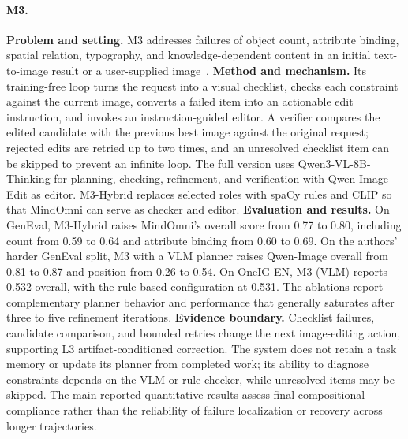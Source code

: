 \paragraph{M3.}
\textbf{Problem and setting.} M3 addresses failures of object count, attribute binding, spatial relation, typography, and knowledge-dependent content in an initial text-to-image result or a user-supplied image~\cite{avg260206166}. \textbf{Method and mechanism.} Its training-free loop turns the request into a visual checklist, checks each constraint against the current image, converts a failed item into an actionable edit instruction, and invokes an instruction-guided editor. A verifier compares the edited candidate with the previous best image against the original request; rejected edits are retried up to two times, and an unresolved checklist item can be skipped to prevent an infinite loop. The full version uses Qwen3-VL-8B-Thinking for planning, checking, refinement, and verification with Qwen-Image-Edit as editor. M3-Hybrid replaces selected roles with spaCy rules and CLIP so that MindOmni can serve as checker and editor. \textbf{Evaluation and results.} On GenEval, M3-Hybrid raises MindOmni's overall score from 0.77 to 0.80, including count from 0.59 to 0.64 and attribute binding from 0.60 to 0.69. On the authors' harder GenEval split, M3 with a VLM planner raises Qwen-Image overall from 0.81 to 0.87 and position from 0.26 to 0.54. On OneIG-EN, M3 (VLM) reports 0.532 overall, with the rule-based configuration at 0.531. The ablations report complementary planner behavior and performance that generally saturates after three to five refinement iterations. \textbf{Evidence boundary.} Checklist failures, candidate comparison, and bounded retries change the next image-editing action, supporting L3 artifact-conditioned correction. The system does not retain a task memory or update its planner from completed work; its ability to diagnose constraints depends on the VLM or rule checker, while unresolved items may be skipped. The main reported quantitative results assess final compositional compliance rather than the reliability of failure localization or recovery across longer trajectories.

